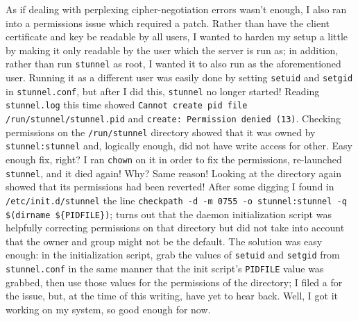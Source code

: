 \documentclass{article}
\begin{document}
As if dealing with perplexing cipher-negotiation errors wasn't enough, I also ran into a permissions issue which required a patch.  Rather than have the client certificate and key be readable by all users, I wanted to harden my setup a little by making it only readable by the user which the server is run as; in addition, rather than run \texttt{stunnel} as root, I wanted it to also run as the aforementioned user.  Running it as a different user was easily done by setting \texttt{setuid} and \texttt{setgid} in \texttt{stunnel.conf}, but after I did this, \texttt{stunnel} no longer started!  Reading \texttt{stunnel.log} this time showed \texttt{Cannot create pid file /run/stunnel/stunnel.pid} and \texttt{create: Permission denied (13)}.  Checking permissions on the \texttt{/run/stunnel} directory showed that it was owned by \texttt{stunnel:stunnel} and, logically enough, did not have write access for other.  Easy enough fix, right?  I ran \texttt{chown} on it in order to fix the permissions, re-launched \texttt{stunnel}, and it died again!  Why?  Same reason!  Looking at the directory again showed that its permissions had been reverted!  After some digging I found in \texttt{/etc/init.d/stunnel} the line \verb|checkpath -d -m 0755 -o stunnel:stunnel -q $(dirname ${PIDFILE})|; turns out that the daemon initialization script was helpfully correcting permissions on that directory but did not take into account that the owner and group might not be the default.  The solution was easy enough: in the initialization script, grab the values of \texttt{setuid} and \texttt{setgid} from \texttt{stunnel.conf} in the same manner that the init script's \texttt{PIDFILE} value was grabbed, then use those values for the permissions of the directory; I filed a  for the issue, but, at the time of this writing, have yet to hear back.  Well, I got it working on my system, so good enough for now.
\end{document}
